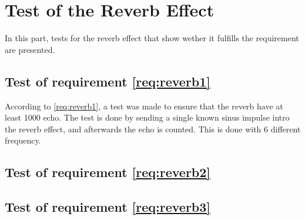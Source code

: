 \section{Test of the Reverb Effect}
In this part, tests for the reverb effect that show wether it fulfills the requirement are presented. 


\subsection{Test of requirement \autoref{req:reverb1}}
According to \autoref{req:reverb1}, a test was made to ensure that the \gls{reverb} have at least 1000 echo. The test is done by sending a single known sinus impulse intro the \gls{reverb} effect, and afterwards the echo is counted. This is done with 6 different frequency. 




\subsection{Test of requirement \autoref{req:reverb2}}

\subsection{Test of requirement \autoref{req:reverb3}}

